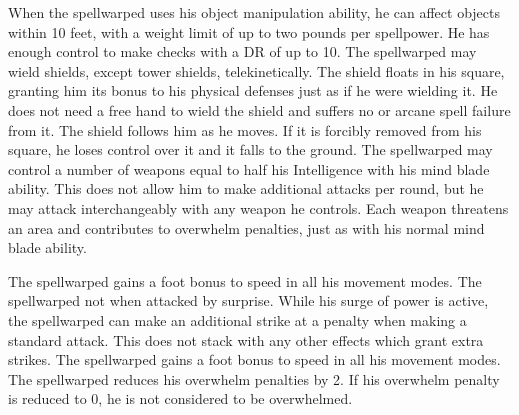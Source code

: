     When the spellwarped uses his object manipulation ability, he can affect objects within 10 feet, with a weight limit of up to two pounds per spellpower.
    He has enough control to make checks with a DR of up to 10.
    The spellwarped may wield shields, except tower shields, telekinetically.
    The shield floats in his square, granting him its bonus to his physical defenses just as if he were wielding it.
    He does not need a free hand to wield the shield and suffers no  or arcane spell failure from it.
    The shield follows him as he moves.
    If it is forcibly removed from his square, he loses control over it and it falls to the ground.
    The spellwarped may control a number of weapons equal to half his Intelligence with his mind blade ability.
    This does not allow him to make additional attacks per round, but he may attack interchangeably with any weapon he controls.
    Each weapon threatens an area and contributes to overwhelm penalties, just as with his normal mind blade ability.

    The spellwarped gains a  foot bonus to speed in all his movement modes.
    The spellwarped not \unaware when attacked by surprise.
    While his surge of power is active, the spellwarped can make an additional strike at a  penalty when making a standard attack.
    This does not stack with any other effects which grant extra strikes.
    The spellwarped gains a  foot bonus to speed in all his movement modes.
    The spellwarped reduces his overwhelm penalties by 2.
    If his overwhelm penalty is reduced to 0, he is not considered to be overwhelmed.

